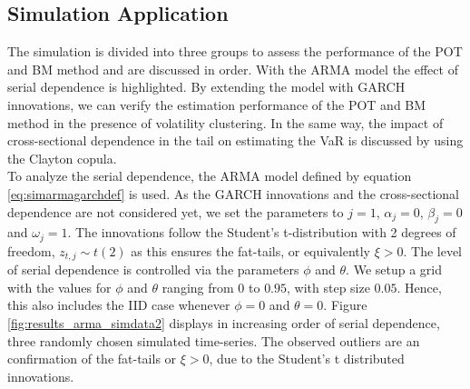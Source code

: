 \documentclass[a4paper,12pt]{article}
\theoremstyle{plain}
\begin{document}
\subsection{Simulation Application}

The simulation is divided into three groups to assess the performance of the POT and BM method and are discussed in order. With the ARMA model the effect of serial dependence is highlighted. By extending the model with GARCH innovations, we can verify the estimation performance of the POT and BM method in the presence of volatility clustering. In the same way, the impact of cross-sectional dependence in the tail on estimating the VaR is discussed by using the Clayton copula.\\

To analyze the serial dependence, the ARMA model defined by equation \eqref{eq:simarmagarchdef} is used. As the GARCH innovations and the cross-sectional dependence are not considered yet, we set the parameters to $j=1$, $\alpha_j=0$, $\beta_j=0$ and $\omega_j=1$. The innovations follow the Student's t-distribution with 2 degrees of freedom, $z_{t,j}\sim t\left(2\right)$ as this ensures the fat-tails, or equivalently $\xi>0$. The level of serial dependence is controlled via the parameters $\phi$ and $\theta$. We setup a grid with the values for $\phi$ and $\theta$ ranging from $0$ to $0.95$, with step size $0.05$. Hence, this also includes the IID case whenever $\phi=0$ and $\theta=0$. Figure \ref{fig:results_arma_simdata2} displays in increasing order of serial dependence, three randomly chosen simulated time-series. The observed outliers are an confirmation of the fat-tails or $\xi>0$, due to the Student's t distributed innovations.
\end{document}

